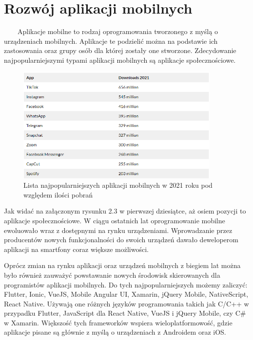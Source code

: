 \documentclass[a4paper,12pt,oneside]{book}
\begin{document}
	\section{Rozwój aplikacji mobilnych}
	\ \ \ \
	Aplikacje mobilne to rodzaj oprogramowania tworzonego z myślą o urządzeniach mobilnych. Aplikacje te podzielić można na podstawie ich zastosowania oraz grupy osób dla której zostały one stworzone. Zdecydowanie najpopularniejszymi typami aplikacji mobilnych są aplikacje społecznościowe.
	
	\begin{figure}[h]
		\centering
		\includegraphics[width=0.9\textwidth]{grafika/most_popular_apps_2021.png}
		\caption{Lista najpopularniejszych aplikacji mobilnych w 2021 roku pod względem ilości pobrań}
	\end{figure}

	Jak widać na załączonym rysunku 2.3 w pierwszej dziesiątce, aż osiem pozycji to aplikacje społecznościowe.  W ciągu ostatnich lat oprogramowanie mobilne ewoluowało wraz z dostępnymi na rynku urządzeniami. Wprowadzanie przez producentów nowych funkcjonalności do swoich urządzeń dawało deweloperom aplikacji na smartfony coraz większe możliwości. 
	
	\newpage
	
	Oprócz zmian na rynku aplikacji oraz urządzeń mobilnych z biegiem lat można było również zauważyć powstawanie nowych środowisk skierowanych dla programistów aplikacji mobilnych. Do tych najpopularniejszych możemy zaliczyć: Flutter, Ionic, VueJS, Mobile Angular UI, Xamarin, jQuery Mobile, NativeScript, React Native. Używają one różnych języków programowania takich jak C/C++ w przypadku Flutter, JavaScript dla React Native, VueJS i jQuery Mobile, czy C\# w Xamarin. Większość tych frameworków wspiera wieloplatformowość, gdzie aplikacje pisane są głównie z myślą o urządzeniach z Androidem oraz iOS.
	
\end{document}
